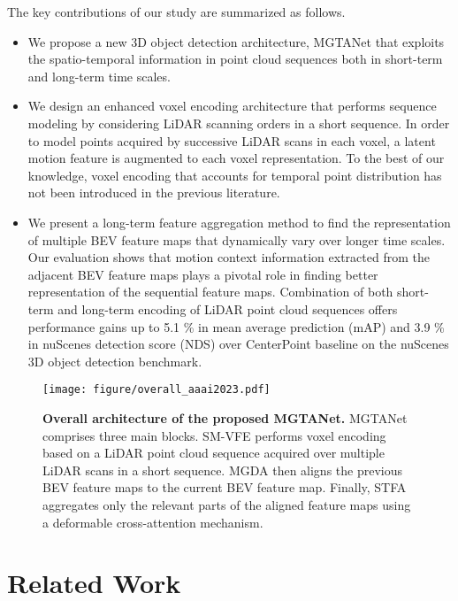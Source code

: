 \documentclass[letterpaper]{article} \usepackage{aaai23}  \usepackage{times}  \usepackage{helvet}  \usepackage{courier}  \usepackage[hyphens]{url}  \usepackage{graphicx} \urlstyle{rm} \def\UrlFont{\rm}  \usepackage{natbib}  \usepackage{caption} \frenchspacing  \setlength{\pdfpagewidth}{8.5in} \usepackage{algorithm}
\begin{document}
The key contributions of our study are summarized as follows.
\begin{itemize}
    \item We propose a new 3D object detection architecture, MGTANet that exploits the spatio-temporal information in point cloud sequences both in short-term and long-term time scales.
    
    \item We design an enhanced voxel encoding architecture that performs sequence modeling by considering LiDAR scanning orders in a short sequence. In order to model points acquired by successive LiDAR scans in each voxel, a latent motion feature is augmented to each voxel representation. To the best of our knowledge, voxel encoding that accounts for temporal point distribution has not been introduced in the previous literature.
    
    \item We present a long-term feature aggregation method to find the representation of multiple BEV feature maps that dynamically vary over longer time scales. Our evaluation shows that motion context information extracted from the adjacent BEV feature maps plays a pivotal role in finding better representation of the sequential feature maps. Combination of both short-term and long-term encoding of LiDAR point cloud sequences offers performance gains up to 5.1 \% in mean average prediction (mAP) and 3.9 \% in nuScenes detection score (NDS) over CenterPoint baseline \cite{centerpoint} on the nuScenes 3D object detection benchmark. 

\end{itemize}

\begin{figure*}[t]
	\centering
        \centerline{\texttt{[image: figure/overall\_aaai2023.pdf]}}
    	\caption {\textbf{Overall architecture of the proposed MGTANet.} MGTANet comprises three main blocks. SM-VFE performs voxel encoding based on a LiDAR point cloud sequence acquired over multiple LiDAR scans in a short sequence. MGDA then aligns the previous BEV feature maps to the current BEV feature map. Finally, STFA aggregates only the relevant parts of the aligned feature maps using a deformable cross-attention mechanism.}
	\label{overall}
\end{figure*}

\section{Related Work}
\end{document}
